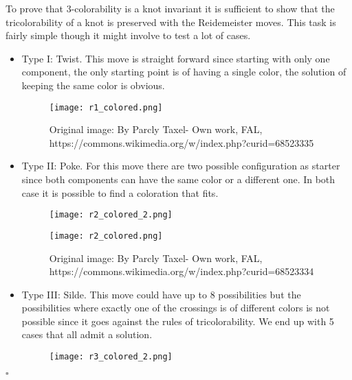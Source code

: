 \documentclass[12pt, a4paper]{article}
\newenvironment{proof}{{\sc Proof:}}{\hfill $\square$}
\begin{document}
\begin{proof}

To prove that 3-colorability is a knot invariant it is sufficient to show that the tricolorability of a knot is preserved with the Reidemeister moves. This task is fairly simple though it might involve to test a lot of cases.

\begin{itemize}
  \item Type I: Twist. This move is straight forward since starting with only one component, the only starting point is of having a single color, the solution of keeping the same color is obvious.
\begin{figure}[H]
             \centering
            \texttt{[image: r1\_colored.png]}
          \caption{Original image: By Parcly Taxel- Own work, FAL, https://commons.wikimedia.org/w/index.php?curid=68523335}
        \label{fig:r_1_colored}
\end{figure}

\item Type II: Poke. For this move there are two possible configuration as starter since both components can have the same color or a different one. In both case it is possible to find a coloration that fits.

\begin{figure}[H]
  \begin{minipage}[c]{.5\textwidth}
             \centering
            \texttt{[image: r2\_colored\_2.png]}
    
  \end{minipage}
  \begin{minipage}[c]{.5\textwidth}
             \centering
            \texttt{[image: r2\_colored.png]}
    
  \end{minipage}
          \caption{Original image: By Parcly Taxel- Own work, FAL, https://commons.wikimedia.org/w/index.php?curid=68523334}
        \label{fig:r_2_colored}
\end{figure}

\item Type III: Silde. This move could have up to 8 possibilities but the possibilities where exactly one of the crossings is of different colors is not possible since it goes against the rules of tricolorability. We end up with 5 cases that all admit a solution.   

\begin{figure}[H]
  \begin{minipage}[c]{.3\textwidth}
             \centering
            \texttt{[image: r3\_colored\_2.png]}
    

\end{minipage}
\end{figure}
\end{itemize}
\end{proof}
\end{document}
